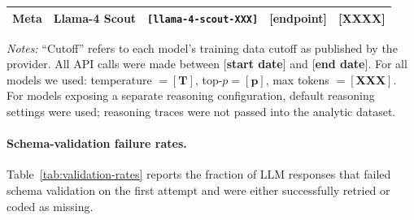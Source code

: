 \documentclass[12pt]{article}
\begin{document}
\begin{table}[h]
\begin{threeparttable}
\begin{tabular}{lllll}
        Meta      & Llama-4 Scout        & \texttt{[\textbf{llama-4-scout-XXX}]}               & [\textbf{endpoint}]      & [\textbf{XXXX}] \\
        \bottomrule
    \end{tabular}
    \begin{tablenotes}\footnotesize
        \item \textit{Notes:} ``Cutoff'' refers to each model's training data cutoff as published by the provider. All API calls were made between [\textbf{start date}] and [\textbf{end date}]. For all models we used: temperature $= [\textbf{T}]$, top-$p = [\textbf{p}]$, max tokens $= [\textbf{XXX}]$. For models exposing a separate reasoning configuration, default reasoning settings were used; reasoning traces were not passed into the analytic dataset.
    \end{tablenotes}
    \end{threeparttable}
\end{table}

\paragraph{Schema-validation failure rates.} Table~\ref{tab:validation-rates} reports the fraction of LLM responses that failed schema validation on the first attempt and were either successfully retried or coded as missing.
\end{document}
